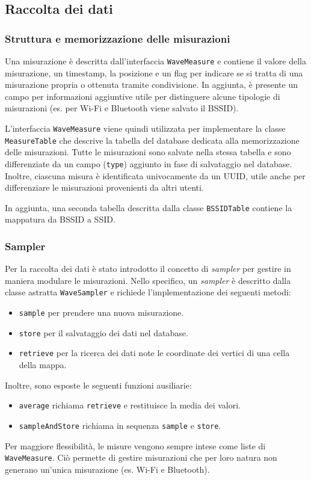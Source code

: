 \subsection{Raccolta dei dati}

\subsubsection{Struttura e memorizzazione delle misurazioni}
Una misurazione è descritta dall'interfaccia \texttt{WaveMeasure} e contiene il valore della misurazione, un timestamp, la posizione e un flag per indicare se si tratta di una misurazione propria o ottenuta tramite condivisione. 
In aggiunta, è presente un campo per informazioni aggiuntive utile per distinguere alcune tipologie di misurazioni (es. per Wi-Fi e Bluetooth viene salvato il BSSID).

L'interfaccia \texttt{WaveMeasure} viene quindi utilizzata per implementare la classe \texttt{MeasureTable} che descrive la tabella del database dedicata alla memorizzazione delle misurazioni. 
Tutte le misurazioni sono salvate nella stessa tabella e sono differenziate da un campo (\texttt{type}) aggiunto in fase di salvataggio nel database.
Inoltre, ciascuna misura è identificata univocamente da un UUID, utile anche per differenziare le misurazioni provenienti da altri utenti.

In aggiunta, una seconda tabella descritta dalla classe \texttt{BSSIDTable} contiene la mappatura da BSSID a SSID.


\subsubsection{Sampler}
Per la raccolta dei dati è stato introdotto il concetto di \textit{sampler} per gestire in maniera modulare le misurazioni.
Nello specifico, un \textit{sampler} è descritto dalla classe astratta \texttt{WaveSampler} e richiede l'implementazione dei seguenti metodi:
\begin{itemize}
    \item \texttt{sample} per prendere una nuova misurazione.
    \item \texttt{store} per il salvataggio dei dati nel database.
    \item \texttt{retrieve} per la ricerca dei dati note le coordinate dei vertici di una cella della mappa.
\end{itemize}
Inoltre, sono esposte le seguenti funzioni ausiliarie:
\begin{itemize}
    \item \texttt{average} richiama \texttt{retrieve} e restituisce la media dei valori.
    \item \texttt{sampleAndStore} richiama in sequenza \texttt{sample} e \texttt{store}.
\end{itemize}
Per maggiore flessibilità, le misure vengono sempre intese come liste di \texttt{WaveMeasure}. Ciò permette di gestire misurazioni che per loro natura non generano un'unica misurazione (es. Wi-Fi e Bluetooth).


